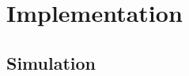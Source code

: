\documentclass[
    fontsize=10pt,    %
    a4paper,      %
    parskip=half-,    %
    twoside,      %
    headings=big,  %
    appendixprefix=true,
    ]{scrreprt}    %
\begin{document}
\chapter{Implementation}\label{chapter:xxxname3xxx}
%


\section{Simulation}\label{chapter:sim}







%

%

%





\end{document}
